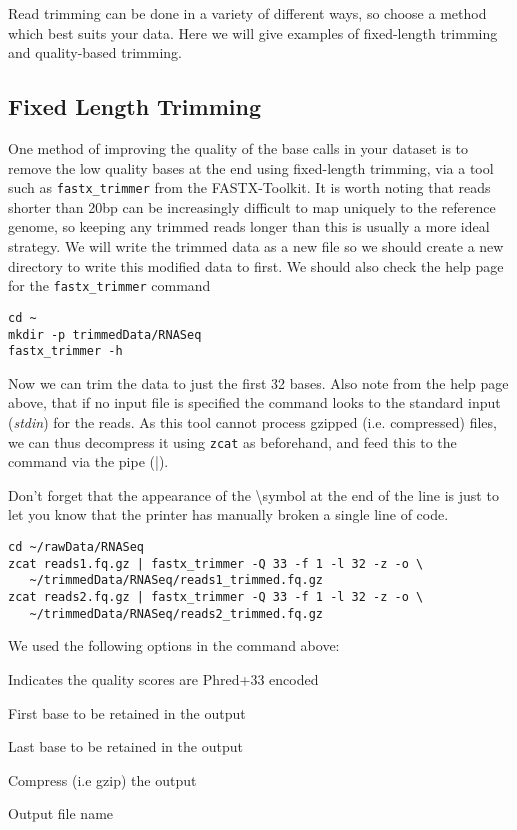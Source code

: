 Read trimming can be done in a variety of different ways, so choose a method which best suits your data. 
Here we will give examples of fixed-length trimming and quality-based trimming.

\subsection{Fixed Length Trimming}
One method of improving the quality of the base calls in your dataset is to remove the low quality bases at the end using fixed-length trimming, via a tool such as \texttt{fastx_trimmer} from the FASTX-Toolkit.
It is worth noting that reads shorter than 20bp can be increasingly difficult to map uniquely to the reference genome, so keeping any trimmed reads longer than this is usually a more ideal strategy.
We will write the trimmed data as a new file so we should create a new directory to write this modified data to first.
We should also check the help page for the \texttt{fastx_trimmer} command
\begin{steps}
\begin{lstlisting}
cd ~
mkdir -p trimmedData/RNASeq
fastx_trimmer -h
\end{lstlisting}
\end{steps}

\begin{steps}
Now we can trim the data to just the first 32 bases.
Also note from the help page above, that if no input file is specified the command looks to the standard input (\textit{stdin}) for the reads.
As this tool cannot process gzipped (i.e. compressed) files, we can thus decompress it using \texttt{zcat} as beforehand, and feed this to the command via the pipe (|).
\end{steps}
\begin{warning}
Don't forget that the appearance of the \textbackslash  symbol at the end of the line is just to let you know that the printer has manually broken a single line of code.
\end{warning}
\begin{lstlisting}
cd ~/rawData/RNASeq
zcat reads1.fq.gz | fastx_trimmer -Q 33 -f 1 -l 32 -z -o \
   ~/trimmedData/RNASeq/reads1_trimmed.fq.gz
zcat reads2.fq.gz | fastx_trimmer -Q 33 -f 1 -l 32 -z -o \
   ~/trimmedData/RNASeq/reads2_trimmed.fq.gz
\end{lstlisting}

\begin{note}
We used the following options in the command above:
\begin{description}[style=multiline,labelindent=0cm,align=right,leftmargin=0.8\descriptionlabelspace,rightmargin=1.5cm,font=\ttfamily]
\item[-Q 33] Indicates the quality scores are Phred+33 encoded
\item[-f 1] First base to be retained in the output
\item[-l 32] Last base to be retained in the output
\item[-z] Compress (i.e gzip) the output
\item[-o] Output file name
\end{description}
\end{note}

